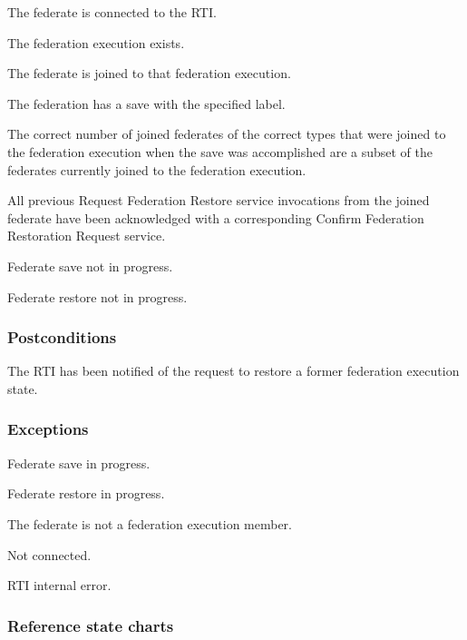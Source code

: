 \begin{stdalphalist}
    \item The federate is connected to the RTI.
    \item The federation execution exists.
    \item The federate is joined to that federation execution.
    \item The federation has a save with the specified label.
    \item The correct number of joined federates of the correct types that were joined to the federation execution when the save was accomplished are a subset of the federates currently joined to the federation execution.
    \item All previous Request Federation Restore service invocations from the joined federate have been acknowledged with a corresponding Confirm Federation Restoration Request \rtiinitiated{} service.
    \item Federate save not in progress.
    \item Federate restore not in progress.
\end{stdalphalist}

\subsubsection{Postconditions}

\begin{stdalphalist}
    \item The RTI has been notified of the request to restore a former federation execution state.
\end{stdalphalist}

\subsubsection{Exceptions}

\begin{stdalphalist}
    \item Federate save in progress.
    \item Federate restore in progress.
    \item The federate is not a federation execution member.
    \item Not connected.
    \item RTI internal error.
\end{stdalphalist}

\subsubsection{Reference state charts}

